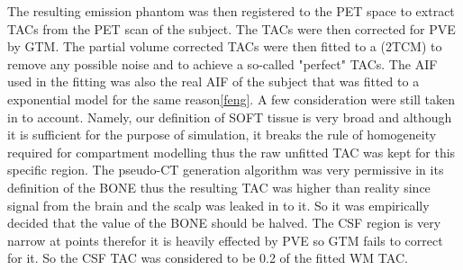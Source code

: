 The resulting emission phantom was then registered to the PET space to extract TACs from the PET scan of the subject.
The TACs were then corrected for PVE by GTM.
The partial volume corrected TACs were then fitted to a (2TCM) to remove any possible noise and to achieve a so-called "perfect" TACs.
The AIF used in the fitting was also the real AIF of the subject that was fitted to a exponential model for the same reason\ref{feng}.
A few consideration were still taken in to account.
Namely, our definition of SOFT tissue is very broad and although it is sufficient for the purpose of simulation, it breaks the rule of homogeneity required for compartment modelling thus the raw unfitted TAC was kept for this specific region.
The pseudo-CT generation algorithm was very permissive in its definition of the BONE thus the resulting TAC was higher than reality since signal from the brain and the scalp was leaked in to it.
So it was empirically decided that the value of the BONE should be halved.
The CSF region is very narrow at points therefor it is heavily effected by PVE so GTM fails to correct for it.
So the CSF TAC was considered to be 0.2 of the fitted WM TAC.

